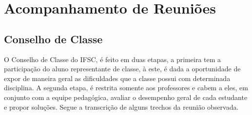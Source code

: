 \chapter{Acompanhamento de Reuniões}
\label{cap: reunPedagogica}
\section{Conselho de Classe}

O Conselho de Classe do IFSC, é feito em duas etapas, a primeira tem a participação do aluno representante de classe, à este, é dada a oportunidade de expor de maneira geral as dificuldades que a classe possui com determinada disciplina. A segunda etapa, é restrita somente aos professores e cabem a eles, em conjunto com a equipe pedagógica, avaliar o desempenho geral de cada estudante e propor soluções. Segue a transcrição de alguns trechos da reunião observada.

